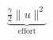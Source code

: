 \documentclass[preview]{standalone}
\begin{document}
\begin{align*}
\underbrace{\tfrac{\gamma}{2}\|u\|^2}_{\text{effort}}
\end{align*}
\end{document}
